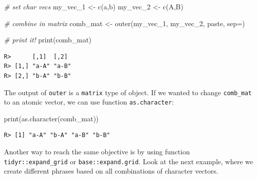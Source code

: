 \documentclass[
  12pt,
]{book}
\newenvironment{Shaded}{\begin{snugshade}}{\end{snugshade}}
\newcommand{\AttributeTok}[1]{\textcolor[rgb]{0.61,0.61,0.61}{#1}}
\newcommand{\CommentTok}[1]{\textcolor[rgb]{0.37,0.37,0.37}{\textit{#1}}}
\newcommand{\FunctionTok}[1]{\textcolor[rgb]{0,0,0}{#1}}
\newcommand{\NormalTok}[1]{#1}
\newcommand{\OtherTok}[1]{\textcolor[rgb]{0.37,0.37,0.37}{#1}}
\newcommand{\StringTok}[1]{\textcolor[rgb]{0.5,0.5,0.5}{#1}}
\begin{document}
\begin{Shaded}
\begin{Highlighting}[]
\CommentTok{\# set char vecs}
\NormalTok{my\_vec\_1 }\OtherTok{\textless{}{-}} \FunctionTok{c}\NormalTok{(}\StringTok{\textquotesingle{}a\textquotesingle{}}\NormalTok{,}\StringTok{\textquotesingle{}b\textquotesingle{}}\NormalTok{)}
\NormalTok{my\_vec\_2 }\OtherTok{\textless{}{-}} \FunctionTok{c}\NormalTok{(}\StringTok{\textquotesingle{}A\textquotesingle{}}\NormalTok{,}\StringTok{\textquotesingle{}B\textquotesingle{}}\NormalTok{)}

\CommentTok{\# combine in matrix}
\NormalTok{comb\_mat }\OtherTok{\textless{}{-}} \FunctionTok{outer}\NormalTok{(my\_vec\_1, my\_vec\_2, paste, }\AttributeTok{sep=}\StringTok{\textquotesingle{}{-}\textquotesingle{}}\NormalTok{)}

\CommentTok{\# print it!}
\FunctionTok{print}\NormalTok{(comb\_mat)}
\end{Highlighting}
\end{Shaded}

\begin{verbatim}
R>      [,1]  [,2] 
R> [1,] "a-A" "a-B"
R> [2,] "b-A" "b-B"
\end{verbatim}

The output of \texttt{outer} is a \texttt{matrix} type of object. If we wanted to change \texttt{comb\_mat} to an atomic vector, we can use function \texttt{as.character}:

\begin{Shaded}
\begin{Highlighting}[]
\FunctionTok{print}\NormalTok{(}\FunctionTok{as.character}\NormalTok{(comb\_mat))}
\end{Highlighting}
\end{Shaded}

\begin{verbatim}
R> [1] "a-A" "b-A" "a-B" "b-B"
\end{verbatim}

Another way to reach the same objective is by using function \texttt{tidyr::expand\_grid} or \texttt{base::expand.grid}. Look at the next example, where we create different phrases based on all combinations of character vectors.
\end{document}
